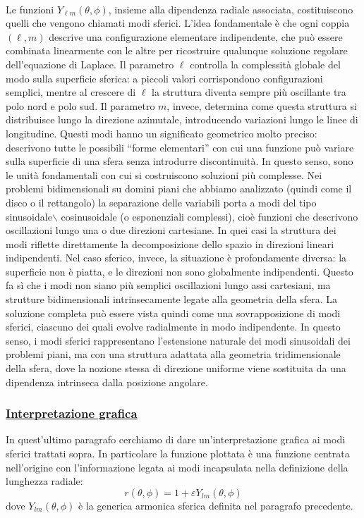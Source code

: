 \documentclass[a4paper,12pt]{report}
\begin{document}
\\Le funzioni $Y_{\ell m}(\theta,\phi)$, insieme alla dipendenza radiale associata, costituiscono quelli che vengono chiamati modi sferici. L’idea fondamentale è che ogni coppia $(\ell,m)$ descrive una configurazione elementare indipendente, che può essere combinata linearmente con le altre per ricostruire qualunque soluzione regolare dell’equazione di Laplace. Il parametro $\ell$ controlla la complessità globale del modo sulla superficie sferica: a piccoli valori corrispondono configurazioni semplici, mentre al crescere di $\ell$ la struttura diventa sempre più oscillante tra polo nord e polo sud. Il parametro $m$, invece, determina come questa struttura si distribuisce lungo la direzione azimutale, introducendo variazioni lungo le linee di longitudine. Questi modi hanno un significato geometrico molto preciso: descrivono tutte le possibili “forme elementari” con cui una funzione può variare sulla superficie di una sfera senza introdurre discontinuità. In questo senso, sono le unità fondamentali con cui si costruiscono soluzioni più complesse. Nei problemi bidimensionali su domini piani che abbiamo analizzato (quindi come il disco o il rettangolo) la separazione delle variabili porta a modi del tipo sinusoidale$\backslash$ cosinusoidale (o esponenziali complessi), cioè funzioni che descrivono oscillazioni lungo una o due direzioni cartesiane. In quei casi la struttura dei modi riflette direttamente la decomposizione dello spazio in direzioni lineari indipendenti. Nel caso sferico, invece, la situazione è profondamente diversa: la superficie non è piatta, e le direzioni non sono globalmente indipendenti. Questo fa sì che i modi non siano più semplici oscillazioni lungo assi cartesiani, ma strutture bidimensionali intrinsecamente legate alla geometria della sfera. La soluzione completa può essere vista quindi come una sovrapposizione di modi sferici, ciascuno dei quali evolve radialmente in modo indipendente. In questo senso, i modi sferici rappresentano l’estensione naturale dei modi sinusoidali dei problemi piani, ma con una struttura adattata alla geometria tridimensionale della sfera, dove la nozione stessa di direzione uniforme viene sostituita da una dipendenza intrinseca dalla posizione angolare.

\subsubsection{\underline{Interpretazione grafica}}

In quest'ultimo paragrafo cerchiamo di dare un'interpretazione grafica ai modi sferici trattati sopra. In particolare la funzione plottata è una funzione centrata nell'origine con l'informazione legata ai modi incapsulata nella definizione della lunghezza radiale:
\[r(\theta,\phi)=1+\varepsilon Y_{lm}(\theta,\phi)\]
dove $Y_{lm}(\theta,\phi)$ è la generica armonica sferica definita nel paragrafo precedente.
\end{document}
